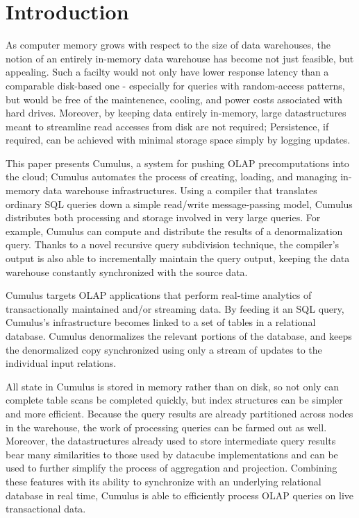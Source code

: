\section{Introduction}

As computer memory grows with respect to the size of data warehouses, the notion of an entirely in-memory data warehouse has become not just feasible, but appealing.  Such a facilty would not only have lower response latency than a comparable disk-based one - especially for queries with random-access patterns, but would be free of the maintenence\cite{}, cooling\cite{}, and power\cite{1154557} costs associated with hard drives.  Moreover, by keeping data entirely in-memory, large datastructures meant to streamline read accesses from disk are not required; Persistence, if required, can be achieved with minimal storage space simply by logging updates.

This paper presents Cumulus, a system for pushing OLAP precomputations into the cloud; Cumulus automates the process of creating, loading, and managing in-memory data warehouse infrastructures.  Using a compiler that translates ordinary SQL queries down a simple read/write message-passing model, Cumulus distributes both processing and storage involved in very large queries.  For example, Cumulus can compute and distribute the results of a denormalization query.  Thanks to a novel recursive query subdivision technique, the compiler's output is also able to incrementally maintain the query output, keeping the data warehouse constantly synchronized with the source data.

Cumulus targets OLAP applications that perform real-time analytics of transactionally maintained and/or streaming data.  By feeding it an SQL query, Cumulus's infrastructure becomes linked to a set of tables in a relational database.  Cumulus denormalizes the relevant portions of the database, and keeps the denormalized copy synchronized using only a stream of updates to the individual input relations.  

All state in Cumulus is stored in memory rather than on disk, so not only can complete table scans be completed quickly, but index structures can be simpler and more efficient.  Because the query results are already partitioned across nodes in the warehouse, the work of processing queries can be farmed out as well.  Moreover, the datastructures already used to store intermediate query results bear many similarities to those used by datacube\cite{datacube} implementations and can be used to further simplify the process of aggregation and projection.  Combining these features with its ability to synchronize with an underlying relational database in real time, Cumulus is able to efficiently process OLAP queries on live transactional data. 

